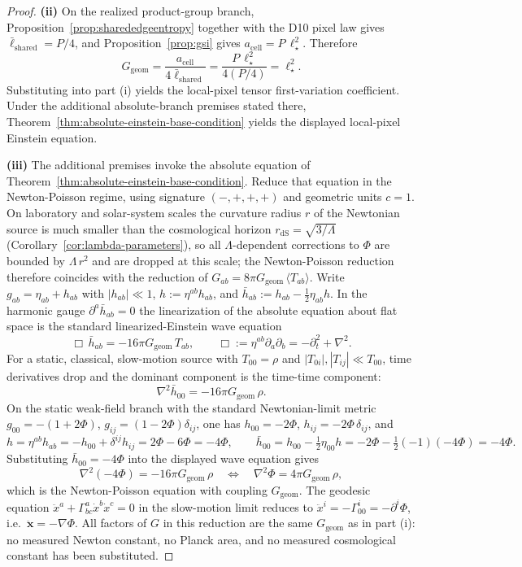 \documentclass[11pt]{article}
\begin{document}
\begin{proof}
\textbf{(ii)} On the realized product-group branch, Proposition~\ref{prop:sharededgeentropy} together with the D10 pixel law gives \(\bar\ell_{\mathrm{shared}}=P/4\), and Proposition~\ref{prop:gsi} gives \(a_{\mathrm{cell}}=P\,\ell_\star^2\). Therefore
\[
G_{\mathrm{geom}}=\frac{a_{\mathrm{cell}}}{4\bar\ell_{\mathrm{shared}}}=\frac{P\,\ell_\star^2}{4(P/4)}=\ell_\star^2.
\]
Substituting into part (i) yields the local-pixel tensor first-variation
coefficient. Under the additional absolute-branch premises stated there,
Theorem~\ref{thm:absolute-einstein-base-condition} yields the displayed
local-pixel Einstein equation.

\textbf{(iii)} The additional premises invoke the absolute equation of
Theorem~\ref{thm:absolute-einstein-base-condition}. Reduce that equation in
the Newton-Poisson regime, using signature \((-,+,+,+)\) and geometric units
\(c=1\). On laboratory and solar-system scales the curvature radius \(r\) of
the Newtonian source is much smaller than the cosmological horizon
\(r_{\mathrm{dS}}=\sqrt{3/\Lambda}\)
(Corollary~\ref{cor:lambda-parameters}), so all \(\Lambda\)-dependent
corrections to \(\Phi\) are bounded by \(\Lambda\,r^2\) and are dropped at
this scale; the Newton-Poisson reduction therefore coincides with the
reduction of
\(G_{ab}=8\pi G_{\mathrm{geom}}\,\langle T_{ab}\rangle\). Write
\(g_{ab}=\eta_{ab}+h_{ab}\) with \(|h_{ab}|\ll 1\),
\(h:=\eta^{ab}h_{ab}\), and
\(\bar h_{ab}:=h_{ab}-\tfrac12\eta_{ab}h\). In the harmonic gauge
\(\partial^a\bar h_{ab}=0\) the linearization of the absolute equation about
flat space is the standard linearized-Einstein wave equation
\[
\Box\,\bar h_{ab}=-16\pi G_{\mathrm{geom}}\,T_{ab},
\qquad
\Box:=\eta^{ab}\partial_a\partial_b=-\partial_t^2+\nabla^2.
\]
For a static, classical, slow-motion source with \(T_{00}=\rho\) and \(|T_{0i}|,|T_{ij}|\ll T_{00}\), time derivatives drop and the dominant component is the time-time component:
\[
\nabla^2\bar h_{00}=-16\pi G_{\mathrm{geom}}\,\rho.
\]
On the static weak-field branch with the standard Newtonian-limit metric \(g_{00}=-(1+2\Phi)\), \(g_{ij}=(1-2\Phi)\delta_{ij}\), one has \(h_{00}=-2\Phi\), \(h_{ij}=-2\Phi\,\delta_{ij}\), and
\[
h=\eta^{ab}h_{ab}=-h_{00}+\delta^{ij}h_{ij}=2\Phi-6\Phi=-4\Phi,
\qquad
\bar h_{00}=h_{00}-\tfrac12\eta_{00}h=-2\Phi-\tfrac12(-1)(-4\Phi)=-4\Phi.
\]
Substituting \(\bar h_{00}=-4\Phi\) into the displayed wave equation gives
\[
\nabla^2(-4\Phi)=-16\pi G_{\mathrm{geom}}\,\rho
\quad\Longleftrightarrow\quad
\nabla^2\Phi=4\pi G_{\mathrm{geom}}\,\rho,
\]
which is the Newton-Poisson equation with coupling \(G_{\mathrm{geom}}\). The geodesic equation \(\ddot x^a+\Gamma^a_{bc}\dot x^b\dot x^c=0\) in the slow-motion limit reduces to \(\ddot x^i=-\Gamma^i_{00}=-\partial^i\Phi\), i.e.\ \(\ddot{\mathbf x}=-\nabla\Phi\). All factors of \(G\) in this reduction are the same \(G_{\mathrm{geom}}\) as in part (i): no measured Newton constant, no Planck area, and no measured cosmological constant has been substituted.
\end{proof}
\end{document}
